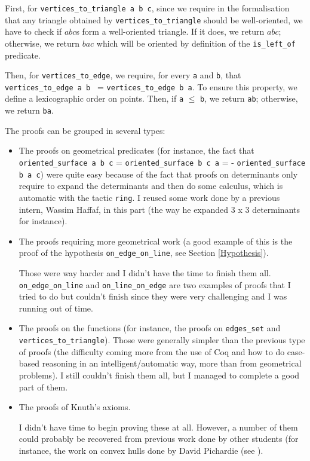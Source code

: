 \documentclass[a4paper,10pt]{article}
\begin{document}
\begin{itemize}
  First, for {\tt vertices\_to\_triangle a b c}, since we require in the formalisation that any triangle obtained by {\tt vertices\_to\_triangle} should be well-oriented, we have to check if $abc$s form a well-oriented triangle. If it does, we return $abc$; otherwise, we return $bac$ which will be oriented by definition of the {\tt is\_left\_of} predicate.

  Then, for {\tt vertices\_to\_edge}, we require, for every {\tt a} and {\tt b}, that {\tt vertices\_to\_edge a b } = {\tt vertices\_to\_edge b a}. To ensure this property, we define a lexicographic order on points. Then, if {\tt a} $\leq$ {\tt b}, we return {\tt ab}; otherwise, we return {\tt ba}.
\end{itemize}
The proofs can be grouped in several types:
\begin{itemize}
\item The proofs on geometrical predicates (for instance, the fact that {\tt oriented\_surface a b c} = {\tt oriented\_surface b c a} = {- \tt oriented\_surface b a c}) were quite easy because of the fact that proofs on determinants only require to expand the determinants and then do some calculus, which is automatic with the tactic {\tt ring}. I reused some work done by a previous intern, Wassim Haffaf, in this part (the way he expanded 3 x 3 determinants for instance).
\item The proofs requiring more geometrical work (a good example of this is the proof of the hypothesis {\tt on\_edge\_on\_line}, see Section \ref{Hypothesis}).

  Those were way harder and I didn't have the time to finish them all. {\tt on\_edge\_on\_line} and {\tt on\_line\_on\_edge} are two examples of proofs that I tried to do but couldn't finish since they were very challenging and I was running out of time.
  \item The proofs on the functions (for instance, the proofs on {\tt edges\_set} and {\tt vertices\_to\_triangle}). Those were generally simpler than the previous type of proofs (the difficulty coming more from the use of {\sc Coq} and how to do case-based reasoning in an intelligent/automatic way, more than from geometrical problems). I still couldn't finish them all, but I managed to complete a good part of them. 

  \item The proofs of Knuth's axioms.

    I didn't have time to begin proving these at all. However, a number of them could probably be recovered from previous work done by other students (for instance, the work on convex hulls done by David Pichardie (see \cite{Hull}).
  \end{itemize}
\end{document}
